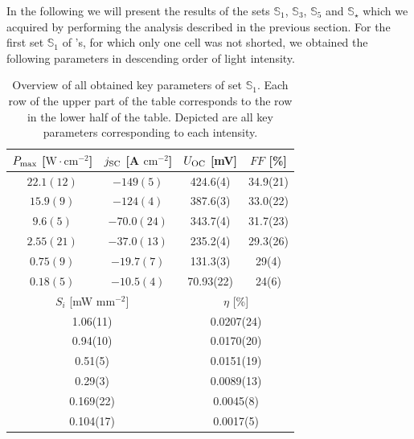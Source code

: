 \documentclass[a4paper,10pt,twocolumn]{article}
\begin{document}
\begin{extract*}
In the following we will present the results of the sets $\mathbb{S}_1$, $\mathbb{S}_3$, $\mathbb{S}_5$ and $\mathbb{S}_\star$ which we acquired by performing the analysis described in the previous section.\mypar
For the first set $\mathbb{S}_1$ of \BHSC's, for which only one cell was not shorted, we obtained the following parameters in descending order of light intensity.
\begin{table}[H]\centering
	\caption{Overview of all obtained key parameters of set $\mathbb{S}_1$. Each row of the upper part of the table corresponds to the row in the lower half of the table. Depicted are all key parameters corresponding to each intensity.}
	\begin{tabular}{@{}cccc@{}}
		\toprule
		$P_{\text{max}}$ [\textmu $\text{W}\!\cdot\!\text{cm}^{-2}$] & $j_{\text{SC}}$ [\textmu A $\mathrm{cm}^{-2}$] & \multicolumn{1}{c}{$U_{\text{OC}}$ [mV]} & $F\!F$ [\%] \\ \midrule
		$ 22.1(12) $                  & $ -149(5) $                           & \multicolumn{1}{c}{424.6(4)}    & 34.9(21)  \\
		$ 15.9(9) $                   & $ -124(4) $                           & \multicolumn{1}{c}{387.6(3)}    & 33.0(22)  \\
		$ 9.6(5) $                    & $ -70.0(24) $                         & \multicolumn{1}{c}{343.7(4)}    & 31.7(23)  \\
		$ 2.55(21) $                  & $ -37.0(13) $                         & \multicolumn{1}{c}{235.2(4)}    & 29.3(26)  \\
		$ 0.75(9) $                   & $ -19.7(7) $                          & \multicolumn{1}{c}{131.3(3)}    & 29(4)     \\
		$ 0.18(5) $                   & $ -10.5(4) $                          & \multicolumn{1}{c}{70.93(22)}   & 24(6)     \\ \midrule
		\multicolumn{2}{c}{$S_{i}$ [mW mm$^{-2}$]}                                               & \multicolumn{2}{c}{$\eta$ [\%]}             \\\midrule
		\multicolumn{2}{c}{1.06(11)}                                                              & \multicolumn{2}{c}{0.0207(24)}              \\
		\multicolumn{2}{c}{0.94(10)}                                                              & \multicolumn{2}{c}{0.0170(20)}              \\
		\multicolumn{2}{c}{0.51(5)}                                                               & \multicolumn{2}{c}{0.0151(19)}              \\
		\multicolumn{2}{c}{0.29(3)}                                                               & \multicolumn{2}{c}{0.0089(13)}              \\
		\multicolumn{2}{c}{0.169(22)}                                                             & \multicolumn{2}{c}{0.0045(8)}               \\
		\multicolumn{2}{c}{0.104(17)}                                                             & \multicolumn{2}{c}{0.0017(5)}               \\ \bottomrule
	\end{tabular}
\end{table}


\end{extract*}
\end{document}
